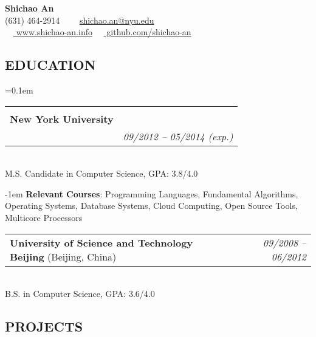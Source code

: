 \documentclass[13pt,letterpaper]{article}
\makeatletter
\newcommand{\headerrow}[2]
{\begin{tabular*}{\linewidth}{l@{\extracolsep{\fill}}r@{\hspace{0.6em}}}
    #1 &
    #2 \\
\end{tabular*}}
\newcommand{\slist}[1]
{
\vspace{-1.8em}
\subsection*{\color{dgray} #1}
\vspace{-0.4em}
}
\newcommand{\sbullet}[1] { \item[-] \leftskip-1em \rightskip2.8cm #1}
\newcommand{\bigtitle}[1]
{
	\vspace{-1.1em} \\
	#1
	\vspace{-1.2em} \\
}
\newcommand{\subtitle}[1]
{
	\vspace{-1.1em} \\
	{\small{#1}}
}
\newcommand{\shortdesc}[1]
{\small \color{dgray}, #1}
\newenvironment{narrowitems}
{\begin{itemize*} \vspace{-0.4em}}
{\vspace{-0.2em} \end{itemize*}}
\makeatother
\begin{document}

\begin{center}
{\huge \textbf{Shichao An}}
\\
\small \vspace{0.4em} \color{dgray}
(631) 464-2914\ \ \textbullet
\ \ \href{mailto:shichao.an@nyu.edu}{shichao.an@nyu.edu}\\
\ \ \href{http://www.shichao-an.info/}{\color{NavyBlue} www.shichao-an.info} \textbullet
\ \ \href{https://github.com/shichao-an}{\color{NavyBlue} github.com/shichao-an}
\end{center}

\slist{EDUCATION}
\begin{itemize}
	\parskip=0.1em
	
    \item
    \headerrow
	{\bigtitle{\textbf{New York University}}}
    {\emph{\color{dgray} \small 09/2012 -- 05/2014 \color{dgray}(exp.)}}
	\subtitle{M.S. Candidate in Computer Science\shortdesc{GPA: 3.8/4.0}}

    \begin{narrowitems}
		 \sbullet \textbf{Relevant Courses}: Programming Languages, Fundamental Algorithms, Operating Systems, Database Systems, Cloud Computing, Open Source Tools, Multicore Processors
    \end{narrowitems}

    \item
    \headerrow
	{\textbf{University of Science and Technology Beijing} \color{dgray} \small (Beijing, China)} 
	{\emph{\color{dgray} \small 09/2008 -- 06/2012}}
	\subtitle{B.S. in Computer Science\shortdesc{GPA: 3.6/4.0}}

\end{itemize}

\slist{PROJECTS}
\end{document}
